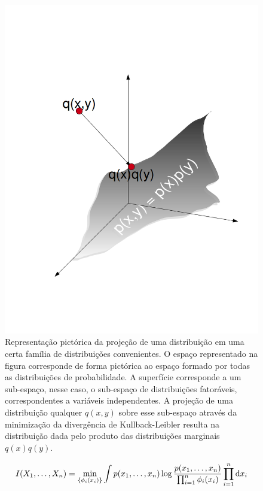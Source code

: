\begin{figure}
	\centering
    	\includegraphics[width = \textwidth]{figuras/distributionmanyfold.png}
 	\caption[Representação pictórica da projeção de uma distribuição.]{ Representação pictórica da projeção de uma distribuição em uma certa família de distribuições convenientes. O espaço representado na figura corresponde de forma pictórica ao espaço formado por todas as distribuições de probabilidade. A superfície corresponde a um sub-espaço, nesse caso, o sub-espaço de distribuições fatoráveis, correspondentes a variáveis independentes. A projeção de uma distribuição qualquer $q(x,y)$ sobre esse sub-espaço através da minimização da divergência de Kullback-Leibler resulta na distribuição dada pelo produto das distribuições marginais $q(x)q(y)$. }
       \label{fig:distributionmanyfold}
\end{figure}
\begin{equation}
\label{eq:infomutua}
I(X_1,\ldots, X_n) = \min_{\{\phi_i(x_i)\}} \int p(x_1,\ldots, x_n) \log \frac{p(x_1,\ldots, x_n)}{\prod_{i=1}^{n}\phi_i(x_i)} \prod_{i=1}^{n}\ud x_i
\end{equation}
